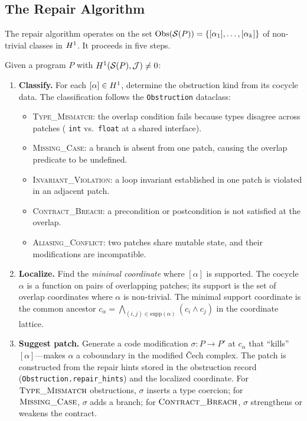 \subsection{The Repair Algorithm}\label{sec:repair-algo}

The repair algorithm operates on the set
$\mathrm{Obs}(\mathcal{S}(P)) = \{[\alpha_1], \ldots, [\alpha_k]\}$ of
non-trivial classes in $H^{1}$.  It proceeds in five steps.

\begin{construction}\label{con:repair}
Given a program $P$ with $H^{1}(\mathcal{S}(P), \mathcal{J}) \neq 0$:

\begin{enumerate}[label=\textbf{Step \arabic*.},leftmargin=*]
  \item \textbf{Classify.}
    For each $[\alpha] \in H^{1}$, determine the obstruction kind
    from its cocycle data.  The classification follows the
    \texttt{Obstruction} dataclass:
    \begin{itemize}[nosep]
      \item \textsc{Type\_Mismatch}: the overlap condition fails
            because types disagree across patches (\eg
            \texttt{int} vs.\ \texttt{float} at a shared interface).
      \item \textsc{Missing\_Case}: a branch is absent from one
            patch, causing the overlap predicate to be undefined.
      \item \textsc{Invariant\_Violation}: a loop invariant
            established in one patch is violated in an adjacent patch.
      \item \textsc{Contract\_Breach}: a precondition or
            postcondition is not satisfied at the overlap.
      \item \textsc{Aliasing\_Conflict}: two patches share mutable
            state, and their modifications are incompatible.
    \end{itemize}

  \item \textbf{Localize.}
    Find the \emph{minimal coordinate} where $[\alpha]$ is
    supported.  The cocycle $\alpha$ is a function on pairs of
    overlapping patches; its support is the set of overlap
    coordinates where $\alpha$ is non-trivial.  The minimal support
    coordinate is the common ancestor
    $c_\alpha = \bigwedge_{(i,j) \in \mathrm{supp}(\alpha)}
     (c_i \wedge c_j)$
    in the coordinate lattice.

  \item \textbf{Suggest patch.}
    Generate a code modification $\sigma : P \to P'$ at $c_\alpha$
    that ``kills'' $[\alpha]$---\ie makes $\alpha$ a coboundary in
    the modified \v{C}ech complex.  The patch is constructed from the
    repair hints stored in the obstruction record
    (\texttt{Obstruction.repair\_hints}) and the localized coordinate.
    For $\textsc{Type\_Mismatch}$ obstructions, $\sigma$ inserts a
    type coercion; for $\textsc{Missing\_Case}$, $\sigma$ adds a
    branch; for $\textsc{Contract\_Breach}$, $\sigma$ strengthens or
    weakens the contract.


\end{enumerate}
\end{construction}
